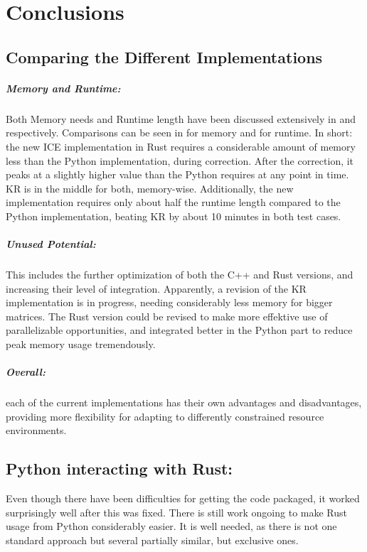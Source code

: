\chapter{Conclusions}\label{chap:conclusion}


\section{Comparing the Different Implementations}

\paragraph{Memory and Runtime:}
Both Memory needs and Runtime length have been discussed extensively in
 and  respectively. Comparisons can be
seen in  for memory and  for runtime.
In short: the new ICE implementation in Rust requires a considerable amount of
memory less than the Python implementation, during correction. After the
correction, it peaks at a slightly higher value than the Python requires at any
point in time. KR is in the middle for both, memory-wise. Additionally, the new
implementation requires only about half the runtime length compared to the
Python implementation, beating KR by about 10 minutes in both test cases.


\paragraph{Unused Potential:}\label{sec:potential} This includes the further
optimization of both the C++ and Rust versions, and increasing their level of
integration. Apparently, a revision of the KR implementation is in progress,
needing considerably less memory for bigger matrices. The Rust version could be
revised to make more effektive use of parallelizable opportunities, and
integrated better in the Python part to reduce peak memory usage tremendously.


\paragraph{Overall:} each of the current implementations has their own
advantages and disadvantages, providing more flexibility for adapting to
differently constrained resource environments.


\section{Python interacting with Rust:} Even though there have been
difficulties for getting the code packaged, it worked surprisingly well after
this was fixed. There is still work ongoing to make Rust usage from Python
considerably easier. It is well needed, as there is not one standard
approach but several partially similar, but exclusive ones.


